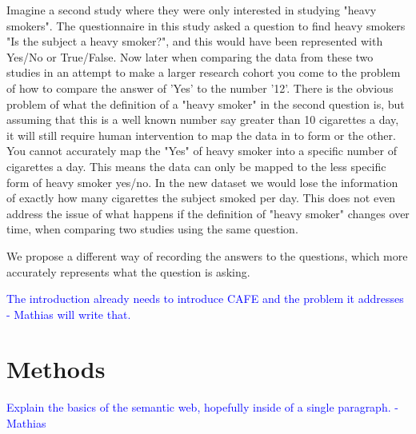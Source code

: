 \documentclass{amia}
\begin{document}
Imagine a second study where they were only interested in studying "heavy smokers".
The questionnaire in this study asked a question to find heavy smokers "Is the subject a heavy smoker?", and this would have been represented with Yes/No or True/False.
Now later when comparing the data from these two studies in an attempt to make a larger research cohort you come to the problem of how to compare the answer of 'Yes' to the number '12'.
There is the obvious problem of what the definition of a "heavy smoker" in the second question is, but assuming that this is a well known number say greater than 10 cigarettes a day, it will still require human intervention to map the data in to form or the other.
You cannot accurately map the "Yes" of heavy smoker into a specific number of cigarettes a day.
This means the data can only be mapped to the less specific form of heavy smoker yes/no.
In the new dataset we would lose the information of exactly how many cigarettes the subject smoked per day.
This does not even address the issue of what happens if the definition of "heavy smoker" changes over time, when comparing two studies using the same question.

We propose a different way of recording the answers to the questions, which more accurately represents what the question is asking.

\textcolor{blue}{The introduction already needs to introduce CAFE and the problem it addresses - Mathias will write that.}

\section*{Methods}
\textcolor{blue}{Explain the basics of the semantic web, hopefully inside of a single paragraph. - Mathias}
\end{document}
